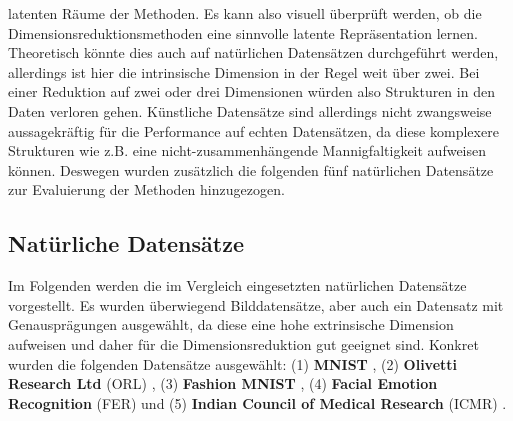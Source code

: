 latenten Räume der Methoden. Es kann also visuell überprüft werden, ob die Dimensionsreduktionsmethoden eine sinnvolle latente Repräsentation lernen. Theoretisch könnte dies auch auf natürlichen Datensätzen durchgeführt werden, allerdings ist hier die intrinsische Dimension in der Regel weit über zwei. Bei einer Reduktion auf zwei oder drei Dimensionen würden also Strukturen in den Daten verloren gehen. Künstliche Datensätze sind allerdings nicht zwangsweise aussagekräftig für die Performance auf echten Datensätzen, da diese komplexere Strukturen wie z.B. eine nicht-zusammenhängende Mannigfaltigkeit aufweisen können. Deswegen wurden zusätzlich die folgenden fünf natürlichen Datensätze zur Evaluierung der Methoden hinzugezogen.

\subsection{Natürliche Datensätze}
\label{ch:Vergleich:sec:VerwendeteDatensaetze:natuerlich}
Im Folgenden werden die im Vergleich eingesetzten natürlichen Datensätze vorgestellt. Es wurden überwiegend Bilddatensätze, aber auch ein Datensatz mit Genausprägungen ausgewählt, da diese eine
hohe extrinsische Dimension aufweisen und daher für die Dimensionsreduktion gut geeignet sind.
Konkret wurden die folgenden Datensätze ausgewählt: (1) \textbf{MNIST} \parencite{LeCun.2010}, (2) \textbf{Olivetti Research Ltd} (ORL)
\parencite{Samaria.1994}, (3) \textbf{Fashion MNIST} \parencite{Xiao.2017}, (4) \textbf{Facial Emotion Recognition} (FER) \parencite{DumitruIanGoodfellowWillCukierskiYoshuaBengio.2013} und (5) \textbf{Indian Council of
	Medical Research} (ICMR) \parencite{Mohapatra.2022}.

